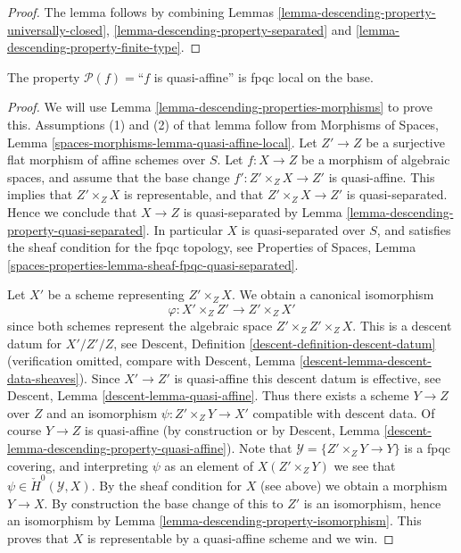 \begin{proof}
The lemma follows by combining
Lemmas \ref{lemma-descending-property-universally-closed},
\ref{lemma-descending-property-separated}
and \ref{lemma-descending-property-finite-type}.
\end{proof}

\begin{lemma}
\label{lemma-descending-property-quasi-affine}
The property $\mathcal{P}(f) =$``$f$ is quasi-affine''
is fpqc local on the base.
\end{lemma}

\begin{proof}
We will use
Lemma \ref{lemma-descending-properties-morphisms}
to prove this. Assumptions (1) and (2) of that lemma follow from
Morphisms of Spaces,
Lemma \ref{spaces-morphisms-lemma-quasi-affine-local}.
Let $Z' \to Z$ be a surjective flat morphism of affine schemes over $S$.
Let $f : X \to Z$ be a morphism of algebraic spaces, and assume
that the base change $f' : Z' \times_Z X \to Z'$ is quasi-affine.
This implies that $Z' \times_Z X$ is representable, and
that $Z' \times_Z X \to Z'$ is quasi-separated. Hence we conclude
that $X \to Z$ is quasi-separated by
Lemma \ref{lemma-descending-property-quasi-separated}.
In particular $X$ is quasi-separated over $S$, and satisfies the
sheaf condition for the fpqc topology, see
Properties of Spaces,
Lemma \ref{spaces-properties-lemma-sheaf-fpqc-quasi-separated}.

\medskip\noindent
Let $X'$ be a scheme representing $Z' \times_Z X$.
We obtain a canonical isomorphism
$$
\varphi : X' \times_Z Z' \longrightarrow Z' \times_Z X'
$$
since both schemes represent the algebraic space $Z' \times_Z Z' \times_Z X$.
This is a descent datum for $X'/Z'/Z$, see
Descent, Definition \ref{descent-definition-descent-datum}
(verification omitted, compare with
Descent, Lemma \ref{descent-lemma-descent-data-sheaves}).
Since $X' \to Z'$ is quasi-affine this descent datum is effective, see
Descent, Lemma \ref{descent-lemma-quasi-affine}.
Thus there exists a scheme $Y \to Z$ over $Z$ and an
isomorphism $\psi : Z' \times_Z Y \to X'$ compatible with descent data.
Of course $Y \to Z$ is quasi-affine (by construction or by
Descent, Lemma \ref{descent-lemma-descending-property-quasi-affine}).
Note that $\mathcal{Y} = \{Z' \times_Z Y \to Y\}$ is a
fpqc covering, and interpreting $\psi$ as an element of
$X(Z' \times_Z Y)$ we see that $\psi \in \check{H}^0(\mathcal{Y}, X)$.
By the sheaf condition for $X$ (see above) we obtain a morphism $Y \to X$.
By construction the base change of this to $Z'$ is an isomorphism, hence
an isomorphism by
Lemma \ref{lemma-descending-property-isomorphism}.
This proves that $X$ is representable by a quasi-affine scheme and we win.
\end{proof}

